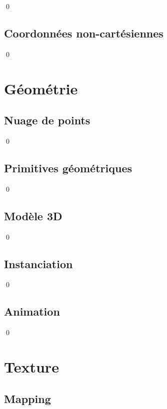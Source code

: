 \documentclass[12pt]{article}
\newcommand{\state}{\noindent}
\begin{document}
\state

\qed

\subsection{Coordonnées non-cartésiennes}

\state

\qed


\pagebreak

\section{Géométrie}

\subsection{Nuage de points}

\state

\qed

\subsection{Primitives géométriques}

\state

\qed

\subsection{Modèle 3D}

\state

\qed

\subsection{Instanciation}

\state

\qed

\subsection{Animation}

\state

\qed

\pagebreak

\section{Texture}

\subsection{Mapping}
\end{document}
